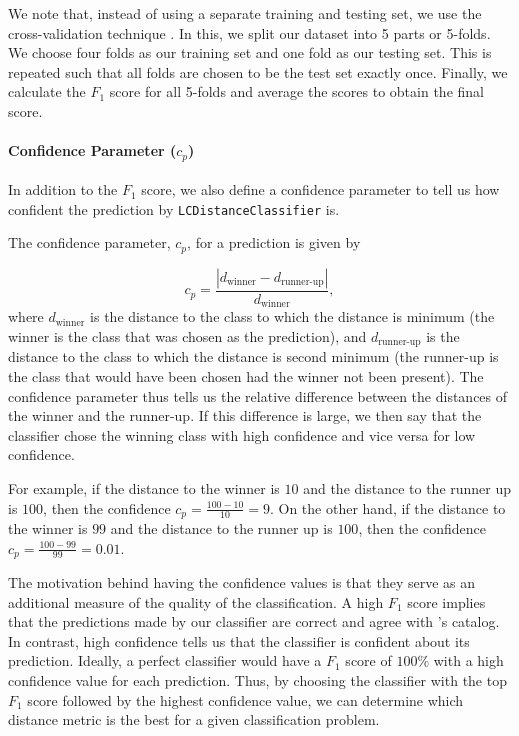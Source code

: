 \documentclass[conference]{IEEEtran}
\begin{document}
We note that, instead of using a separate training and testing set, we use the cross-validation technique \cite{CrossValidation95}. In this, we split our dataset into 5 parts or 5-folds. We choose four folds as our training set and one fold as our testing set. This is repeated such that all folds are chosen to be the test set exactly once. Finally, we calculate the $F_1$ score for all 5-folds and average the scores to obtain the final score.

\paragraph{Confidence Parameter ($c_p$)}

In addition to the $F_1$ score, we also define a confidence parameter to tell us how confident the prediction by \texttt{LCDistanceClassifier} is.

The confidence parameter, $c_p$, for a prediction is given by

\begin{equation} \label{eq:confidence}
    c_p = \frac{|d_{\text{winner}} - d_{\text{runner-up}}|}{d_{\text{winner}}},
\end{equation}
where $d_{\text{winner}}$ is the distance to the class to which the distance is minimum (the winner is the class that was chosen as the prediction), and $d_{\text{runner-up}}$ is the distance to the class to which the distance is second minimum (the runner-up is the class that would have been chosen had the winner not been present). The confidence parameter thus tells us the relative difference between the distances of the winner and the runner-up. If this difference is large, we then say that the classifier chose the winning class with high confidence and vice versa for low confidence.

For example, if the distance to the winner is $10$ and the distance to the runner up is $100$, then the confidence $c_p = \frac{100-10}{10} = 9$. On the other hand, if the distance to the winner is $99$ and the distance to the runner up is $100$, then the confidence $c_p = \frac{100-99}{99} = 0.01$.

The motivation behind having the confidence values is that they serve as an additional measure of the quality of the classification. A high $F_1$ score implies that the predictions made by our classifier are correct and agree with \cite{chenZwickyTransientFacility2020a}'s catalog. In contrast, high confidence tells us that the classifier is confident about its prediction. Ideally, a perfect classifier would have a $F_1$ score of $100\%$ with a high confidence value for each prediction. Thus, by choosing the classifier with the top $F_1$ score followed by the highest confidence value, we can determine which distance metric is the best for a given classification problem.
\end{document}
